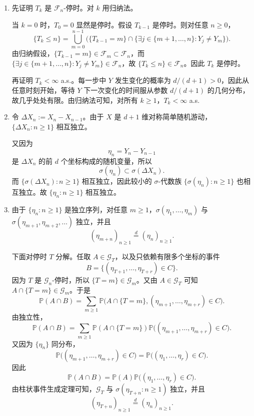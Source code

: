 \documentclass{ctexart}
\begin{document}
\begin{solution}
  \begin{enumerate}
    \item
      先证明 \(T_k\) 是 \(\mathcal F_n\)-停时。对 \(k\) 用归纳法。

      当 \(k=0\) 时，\(T_0=0\) 显然是停时。假设 \(T_{k-1}\) 是停时。则对任意 \(n\ge0\)，
      \[
        \{T_k\le n\}
        =
        \bigcup_{m=0}^{n-1}
        \Big(
          \{T_{k-1}=m\}
          \cap
          \{\exists j\in\{m+1,\dots,n\}:Y_j\neq Y_m\}
        \Big).
      \]
      由归纳假设，\(\{T_{k-1}=m\}\in\mathcal F_m\subset\mathcal F_n\)，而
      \(\{\exists j\in\{m+1,\dots,n\}:Y_j\neq Y_m\}\in\mathcal F_n\)，故 \(\{T_k\le n\}\in\mathcal F_n\)。因此 \(T_k\) 是停时。

      再证明 \(T_k<\infty\) a.s.。每一步中 \(Y\) 发生变化的概率为 \(d/(d+1)>0\)，因此从任意时刻开始，等待 \(Y\) 下一次变化的时间服从参数 \(d/(d+1)\) 的几何分布，故几乎处处有限。由归纳法可知，对所有 \(k\ge1\)，\(T_k<\infty\) a.s.

    \item
      令 \(\Delta X_n:=X_n-X_{n-1}\)。由于 \(X\) 是 \(d+1\) 维对称简单随机游动，\(\{\Delta X_n:n\ge1\}\) 相互独立。

      又因为
      \[
        \eta_n=Y_n-Y_{n-1}
      \]
      是 \(\Delta X_n\) 的前 \(d\) 个坐标构成的随机变量，所以
      \[
        \sigma(\eta_n)\subset \sigma(\Delta X_n).
      \]
      而 \(\{\sigma(\Delta X_n):n\ge1\}\) 相互独立，因此较小的 \(\sigma\)-代数族 \(\{\sigma(\eta_n):n\ge1\}\) 也相互独立。故 \(\{\eta_n:n\ge1\}\) 相互独立。

    \item
      由于 \(\{\eta_n:n\ge1\}\) 是独立序列，对任意 \(m\ge1\)，\(\sigma(\eta_1,\dots,\eta_m)\) 与 \(\sigma(\eta_{m+1},\eta_{m+2},\dots)\) 独立，并且
      \[
        (\eta_{m+n})_{n\ge1}\overset d=(\eta_n)_{n\ge1}.
      \]

      下面对停时 \(T\) 分解。任取 \(A\in\mathcal G_T\)，以及只依赖有限多个坐标的事件
      \[
        B=\{(\eta_{T+1},\dots,\eta_{T+r})\in C\}.
      \]
      因为 \(T\) 是 \(\mathcal G_n\)-停时，所以 \(\{T=m\}\in\mathcal G_m\)。又由 \(A\in\mathcal G_T\) 可知 \(A\cap\{T=m\}\in\mathcal G_m\)。于是
      \[
        \mathbb{P}(A\cap B)
        =
        \sum_{m\ge1}
        \mathbb{P}\big(A\cap\{T=m\},(\eta_{m+1},\dots,\eta_{m+r})\in C\big).
      \]
      由独立性，
      \[
        \mathbb{P}(A\cap B)
        =
        \sum_{m\ge1}
        \mathbb{P}(A\cap\{T=m\})
        \mathbb{P}\big((\eta_{m+1},\dots,\eta_{m+r})\in C\big).
      \]
      又因为 \(\{\eta_n\}\) 同分布，
      \[
        \mathbb{P}\big((\eta_{m+1},\dots,\eta_{m+r})\in C\big)
        =
        \mathbb{P}\big((\eta_1,\dots,\eta_r)\in C\big).
      \]
      因此
      \[
        \mathbb{P}(A\cap B)
        =
        \mathbb{P}(A)\mathbb{P}\big((\eta_1,\dots,\eta_r)\in C\big).
      \]
      由柱状事件生成定理可知，\(\mathcal G_T\) 与 \(\sigma(\eta_{T+n}:n\ge1)\) 独立，并且
      \[
        (\eta_{T+n})_{n\ge1}\overset d=(\eta_n)_{n\ge1}.
      \]


\end{enumerate}
\end{solution}
\end{document}
